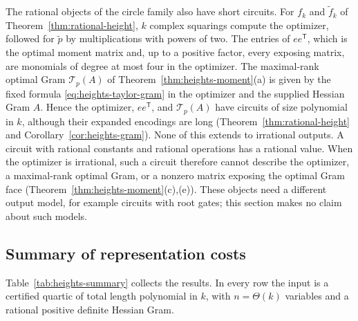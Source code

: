 The rational objects of the circle family also have short circuits. For
$f_k$ and $\tilde f_k$ of Theorem~\ref{thm:rational-height}, $k$ complex
squarings compute the optimizer, followed for $\tilde p$ by multiplications
with powers of two. The entries of $ee^{\mathsf T}$, which is the optimal
moment matrix and, up to a positive factor, every exposing matrix, are
monomials of degree at most four in the optimizer. The maximal-rank optimal
Gram $\mathcal T_p(A)$ of Theorem~\ref{thm:heights-moment}(a) is given by the
fixed formula \eqref{eq:heights-taylor-gram} in the optimizer and the
supplied Hessian Gram $A$. Hence the optimizer, $ee^{\mathsf T}$, and
$\mathcal T_p(A)$ have circuits of size polynomial in $k$, although their
expanded encodings are long (Theorem~\ref{thm:rational-height} and
Corollary~\ref{cor:heights-gram}). None of this extends to irrational
outputs. A circuit with rational constants and rational operations has a
rational value. When the optimizer is irrational, such a circuit therefore
cannot describe the optimizer, a maximal-rank optimal Gram, or a nonzero
matrix exposing the optimal Gram face
(Theorem~\ref{thm:heights-moment}(c),(e)). These objects need a different
output model, for example circuits with root gates; this section makes no
claim about such models.

\subsection{Summary of representation costs}
\label{sec:heights-summary}

Table~\ref{tab:heights-summary} collects the results. In every row the input
is a certified quartic of total length polynomial in $k$, with $n=\Theta(k)$
variables and a rational positive definite Hessian Gram.

